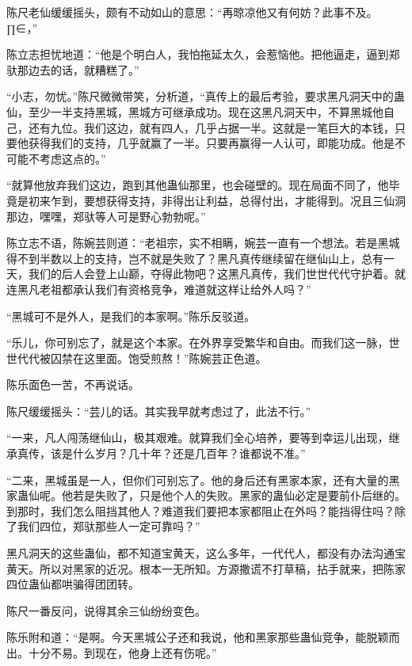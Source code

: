 
\begin{this_body}

陈尺老仙缓缓摇头，颇有不动如山的意思：“再晾凉他又有何妨？此事不及。∏∈，”

陈立志担忧地道：“他是个明白人，我怕拖延太久，会惹恼他。把他逼走，逼到郑驮那边去的话，就糟糕了。”

“小志，勿忧。”陈尺微微带笑，分析道，“真传上的最后考验，要求黑凡洞天中的蛊仙，至少一半支持黑城，黑城方可继承成功。现在这黑凡洞天中，不算黑城他自己，还有九位。我们这边，就有四人，几乎占据一半。这就是一笔巨大的本钱，只要他获得我们的支持，几乎就赢了一半。只要再赢得一人认可，即能功成。他是不可能不考虑这点的。”

“就算他放弃我们这边，跑到其他蛊仙那里，也会碰壁的。现在局面不同了，他毕竟是初来乍到，要想获得支持，非得出让利益，总得付出，才能得到。况且三仙洞那边，嘿嘿，郑驮等人可是野心勃勃呢。”

陈立志不语，陈婉芸则道：“老祖宗，实不相瞒，婉芸一直有一个想法。若是黑城得不到半数以上的支持，岂不就是失败了？黑凡真传继续留在继仙山上，总有一天，我们的后人会登上山巅，夺得此物吧？这黑凡真传，我们世世代代守护着。就连黑凡老祖都承认我们有资格竞争，难道就这样让给外人吗？”

“黑城可不是外人，是我们的本家啊。”陈乐反驳道。

“乐儿，你可别忘了，就是这个本家。在外界享受繁华和自由。而我们这一脉，世世代代被囚禁在这里面。饱受煎熬！”陈婉芸正色道。

陈乐面色一苦，不再说话。

陈尺缓缓摇头：“芸儿的话。其实我早就考虑过了，此法不行。”

“一来，凡人闯荡继仙山，极其艰难。就算我们全心培养，要等到幸运儿出现，继承真传，该是什么岁月？几十年？还是几百年？谁都说不准。”

“二来，黑城虽是一人，但你们可别忘了。他的身后还有黑家本家，还有大量的黑家蛊仙呢。他若是失败了，只是他个人的失败。黑家的蛊仙必定是要前仆后继的。到那时，我们怎么阻挡其他人？难道我们要把本家都阻止在外吗？能挡得住吗？除了我们四位，郑驮那些人一定可靠吗？”

黑凡洞天的这些蛊仙，都不知道宝黄天，这么多年，一代代人，都没有办法沟通宝黄天。所以对黑家的近况。根本一无所知。方源撒谎不打草稿，拈手就来，把陈家四位蛊仙都哄骗得团团转。

陈尺一番反问，说得其余三仙纷纷变色。

陈乐附和道：“是啊。今天黑城公子还和我说，他和黑家那些蛊仙竞争，能脱颖而出。十分不易。到现在，他身上还有伤呢。”


\end{this_body}
